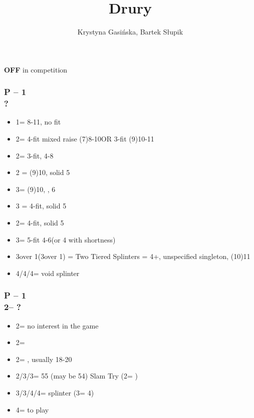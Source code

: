 \documentclass[12pt, a4paper]{article}
\title{Drury}
\author{Krystyna Gasińska, Bartek Słupik}
\begin{document}
\maketitle


{\textbf{OFF}} in competition

\subsubsection*{P -- 1\major \\ ?}
\begin{itemize}
    \item 1\nt = 8-11, no fit
    \item 2\clubs = 4-fit mixed raise (7)8-10\dps OR 3-fit (9)10-11\dps
    \item 2\major = 3-fit, 4-8\dps
    \item 2 = (9)10, solid 5
    \item 3\clubs = (9)10, \inv, 6\clubs
    \item 3 = 4-fit, solid 5
    \item 2\nt = 4-fit, solid 5\clubs
    \item 3\major = 5-fit 4-6\dps (or 4 with shortness)
    \item 3\nt over 1\spades (3\spades over 1\hearts) = Two Tiered Splinters = 4+\major, unspecified singleton, (10)11\dps
    \item 4\clubs/4\diams/4\hearts = void splinter
\end{itemize}

\subsubsection*{P -- 1\hearts \\ 2\clubs -- ?}
\begin{itemize}
    \item 2\hearts = no interest in the game
    \item 2\diams = \inv
    \item 2\spades = \lsf, usually 18-20 \bal
    \item 2\nt/3\clubs/3\diams = 55 (may be 54) Slam Try (2\nt = \spades)
    \item 3\nt/3\spades/4\clubs/4\diams = splinter (3\nt = 4\diams)
    \item 4\hearts = to play
\end{itemize}
\end{document}
